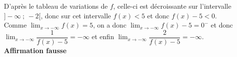 D'après le tableau de variations de $f$, celle-ci est décroissante sur l'intervalle $]- \infty~;~-2[$, donc sur cet intervalle $f(x) < 5$ et donc $f(x)-5<0$.\\
Comme $\displaystyle\lim_{x \to - \infty} f(x) = 5$, on a donc $\displaystyle\lim_{x \to - \infty} f(x) - 5 = 0^{-}$ et donc\\
$\displaystyle\lim_{x \to - \infty} \dfrac{1}{f(x) - 5} = - \infty$ et enfin  $\displaystyle\lim_{x \to - \infty} \dfrac{2}{f(x) - 5} = - \infty$.\\
\hfill\textbf{Affirmation fausse}